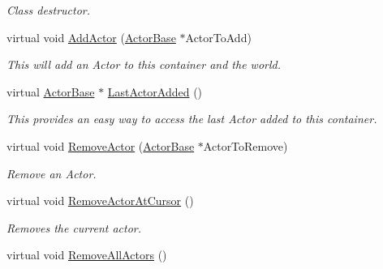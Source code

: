 \begin{DoxyCompactItemize}
\begin{DoxyCompactList}\small\item\em Class destructor. \item\end{DoxyCompactList}\item 
virtual void \hyperlink{classphys_1_1ActorContainerVector_a4bc3e38f16caddee021a97739bebaf6e}{AddActor} (\hyperlink{classphys_1_1ActorBase}{ActorBase} $\ast$ActorToAdd)
\begin{DoxyCompactList}\small\item\em This will add an Actor to this container and the world. \item\end{DoxyCompactList}\item 
virtual \hyperlink{classphys_1_1ActorBase}{ActorBase} $\ast$ \hyperlink{classphys_1_1ActorContainerVector_a49e643bdeff78521de9c4a9fea59a0d2}{LastActorAdded} ()
\begin{DoxyCompactList}\small\item\em This provides an easy way to access the last Actor added to this container. \item\end{DoxyCompactList}\item 
virtual void \hyperlink{classphys_1_1ActorContainerVector_aeee5bd81601faed85e6a35f576c8d476}{RemoveActor} (\hyperlink{classphys_1_1ActorBase}{ActorBase} $\ast$ActorToRemove)
\begin{DoxyCompactList}\small\item\em Remove an Actor. \item\end{DoxyCompactList}\item 
virtual void \hyperlink{classphys_1_1ActorContainerVector_a430977daf010a25f53df6cf37954f8ca}{RemoveActorAtCursor} ()
\begin{DoxyCompactList}\small\item\em Removes the current actor. \item\end{DoxyCompactList}\item 
\hypertarget{classphys_1_1ActorContainerVector_a2e3d86e13cdf46ea73bce70c3dcced3b}{
virtual void \hyperlink{classphys_1_1ActorContainerVector_a2e3d86e13cdf46ea73bce70c3dcced3b}{RemoveAllActors} ()}
\label{d3/d64/classphys_1_1ActorContainerVector_a2e3d86e13cdf46ea73bce70c3dcced3b}


\end{DoxyCompactItemize}
